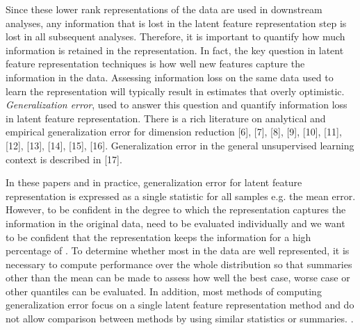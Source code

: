Since these lower rank representations of the data are used in downstream analyses, any information that is lost in the latent feature representation step is lost in all subsequent analyses. Therefore, it is important to quantify how much information is retained in the representation. 
In fact, the key question in latent feature representation techniques is how well new features capture the information in the data.
Assessing information loss on the same data used to learn the representation will typically result in estimates that overly optimistic.
\emph{Generalization error},   used to answer this question and  quantify information loss in latent feature representation. 
There is a rich literature on analytical and empirical generalization error for dimension reduction [6], [7], [8], [9], [10], [11], [12], [13], [14], [15], [16]. 
Generalization error in the general unsupervised learning context is described in [17].

In these papers and in practice, generalization error for latent feature representation is expressed as a single statistic for all samples e.g. the mean  error. 
However, to be confident in the degree to which the representation captures the information in the original data,  need to be evaluated individually and we want to be confident that the representation keeps the information for a high percentage of .
To determine whether most  in the data are well represented, it is necessary to compute performance over the whole distribution so that summaries other than the mean can be made to assess how well the best case, worse case or other quantiles can be evaluated.  
In addition, most methods of computing generalization error focus on a single latent feature representation method and do not allow comparison between methods by using similar statistics or summaries.
.


